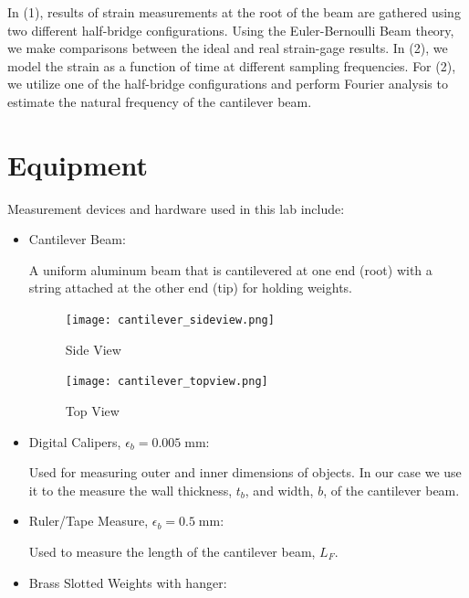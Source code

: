\documentclass{article}
\begin{document}
In (1), results of strain measurements at the root of the beam are gathered using two different half-bridge configurations. Using the Euler-Bernoulli Beam theory, we make comparisons between the ideal and real strain-gage results. In (2), we model the strain as a function of time at different sampling frequencies. For (2), we utilize one of the half-bridge configurations and perform Fourier analysis to estimate the natural frequency of the cantilever beam. 

\section{Equipment}
Measurement devices and hardware used in this lab include:
\begin{itemize}

\item Cantilever Beam: 
\vspace{1mm}

A uniform aluminum beam that is cantilevered at one end (root) with a string attached at the other end (tip) for holding weights.
\vspace{2.5mm}

\begin{figure}[H]
    \centering
    \caption*{Side View}
    \texttt{[image: cantilever\_sideview.png]}
\end{figure}
\begin{figure}[H]
    \centering
    \caption*{Top View}
    \texttt{[image: cantilever\_topview.png]}
\end{figure}

\item Digital Calipers, $\epsilon_{b} = 0.005\; \text{mm}$: 
\vspace{1mm}

Used for measuring outer and inner dimensions of objects. In our case we use it to the measure the wall thickness, $t_{b}$, and width, $b$, of the cantilever beam.
\vspace{2.5mm}

\item Ruler/Tape Measure, $\epsilon_{b} = 0.5\; \text{mm}$: 
\vspace{1mm}

Used to measure the length of the cantilever beam, $L_{F}$.
\vspace{2.5mm}

\item Brass Slotted Weights with hanger: 
\vspace{1mm}


\end{itemize}
\end{document}
